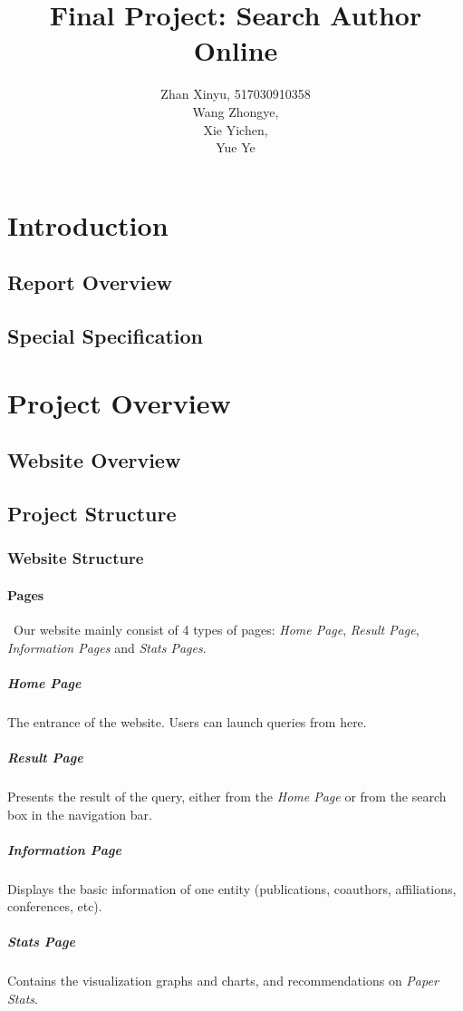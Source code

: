\documentclass[a4paper, 10pt]{article}
\title{\textbf{Final Project: Search Author Online}}
\author{
  Zhan Xinyu, 517030910358\\
  Wang Zhongye, \\
  Xie Yichen, \\
  Yue Ye
}
\begin{document}
\maketitle
\pagebreak
\tableofcontents
\pagebreak

\section{Introduction}
\subsection{Report Overview}
\subsection{Special Specification}
\section{Project Overview}
\subsection{Website Overview}
\subsection{Project Structure}
\subsubsection{Website Structure}
\paragraph{Pages}\
Our website mainly consist of 4 types of pages: \textit{Home Page}, \textit{Result Page}, \textit{Information Pages} and \textit{Stats Pages}.
\subparagraph{\textit{Home Page}} The entrance of the website. Users can launch queries from here.
\subparagraph{\textit{Result Page}} Presents the result of the query, either from the \textit{Home Page} or from the search box in the navigation bar.
\subparagraph{\textit{Information Page}} Displays the basic information of one entity (publications, coauthors, affiliations, conferences, etc).
\subparagraph{\textit{Stats Page}} Contains the visualization graphs and charts, and recommendations on \textit{Paper Stats}.
\\
\end{document}

